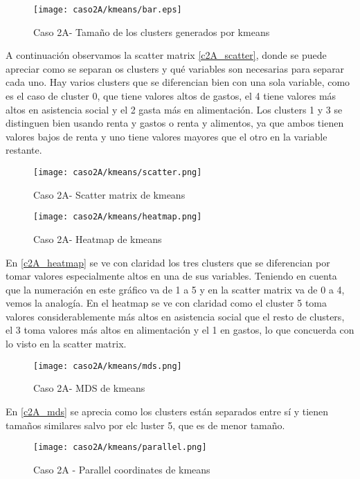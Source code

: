 \begin{figure}[H]
\caption{Caso 2A- Tamaño de los clusters generados por kmeans}
\label{c2A_tam}
\texttt{[image: caso2A/kmeans/bar.eps]}
\end{figure}

A continuación observamos la scatter matrix \eqref{c2A_scatter}, donde se puede apreciar como se separan os clusters y qué variables son necesarias para separar cada uno. Hay varios clusters que se diferencian bien con una sola variable, como es el caso de cluster 0, que tiene valores altos de gastos, el 4 tiene valores más altos en asistencia social y el 2 gasta más en alimentación. Los clusters 1 y 3 se distinguen bien usando renta y gastos o renta y alimentos, ya que ambos tienen valores bajos de renta y uno tiene valores mayores que el otro en la variable restante.

\begin{figure}[H]
\caption{Caso 2A- Scatter matrix de kmeans}
\label{c2A_scatter}
\texttt{[image: caso2A/kmeans/scatter.png]}
\end{figure}


\begin{figure}[H]
\caption{Caso 2A- Heatmap de kmeans}
\label{c2A_heatmap}
\texttt{[image: caso2A/kmeans/heatmap.png]}
\end{figure}

En \eqref{c2A_heatmap} se ve con claridad los tres clusters que se diferencian por tomar valores especialmente altos en una de sus variables. Teniendo en cuenta que la numeración en este gráfico va de 1 a 5 y en la scatter matrix va de 0 a 4, vemos la analogía. En el heatmap se ve con claridad como el cluster 5 toma valores considerablemente más altos en asistencia social que el resto de clusters, el 3 toma valores más altos en alimentación y el 1 en gastos, lo que concuerda con lo visto en la scatter matrix.


\begin{figure}[H]
\caption{Caso 2A- MDS de kmeans}
\label{c2A_mds}
\texttt{[image: caso2A/kmeans/mds.png]}
\end{figure}

En \eqref{c2A_mds} se aprecia como los clusters están separados entre sí y tienen tamaños similares salvo por elc luster 5, que es de menor tamaño.

\begin{figure}[H]
\caption{Caso 2A - Parallel coordinates de kmeans}
\label{c2A_parallel}
\texttt{[image: caso2A/kmeans/parallel.png]}
\end{figure}

